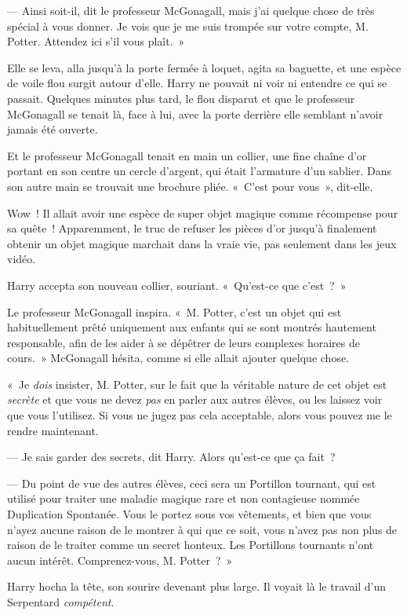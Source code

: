 --- Ainsi soit-il, dit le professeur McGonagall, mais j'ai quelque chose de très spécial à vous donner. Je vois que je me suis trompée sur votre compte, M. Potter. Attendez ici s'il vous plaît.~»

Elle se leva, alla jusqu'à la porte fermée à loquet, agita sa baguette, et une espèce de voile flou surgit autour d'elle. Harry ne pouvait ni voir ni entendre ce qui se passait. Quelques minutes plus tard, le flou disparut et que le professeur McGonagall se tenait là, face à lui, avec la porte derrière elle semblant n'avoir jamais été ouverte.

Et le professeur McGonagall tenait en main un collier, une fine chaîne d'or portant en son centre un cercle d'argent, qui était l'armature d'un sablier. Dans son autre main se trouvait une brochure pliée. «~C'est pour vous~», dit-elle.

Wow~! Il allait avoir une espèce de super objet magique comme récompense pour sa quête~! Apparemment, le truc de refuser les pièces d'or jusqu'à finalement obtenir un objet magique marchait dans la vraie vie, pas seulement dans les jeux vidéo.

Harry accepta son nouveau collier, souriant. «~Qu'est-ce que c'est~?~»

Le professeur McGonagall inspira. «~M. Potter, c'est un objet qui est habituellement prêté uniquement aux enfants qui se sont montrés hautement responsable, afin de les aider à se dépêtrer de leurs complexes horaires de cours.~» McGonagall hésita, comme si elle allait ajouter quelque chose.

«~Je \emph{dois} insister, M. Potter, sur le fait que la véritable nature de cet objet est \emph{secrète} et que vous ne devez \emph{pas} en parler aux autres élèves, ou les laissez voir que vous l'utilisez. Si vous ne jugez pas cela acceptable, alors vous pouvez me le rendre maintenant.

--- Je sais garder des secrets, dit Harry. Alors qu'est-ce que ça fait~?

--- Du point de vue des autres élèves, ceci sera un Portillon tournant, qui est utilisé pour traiter une maladie magique rare et non contagieuse nommée Duplication Spontanée. Vous le portez sous vos vêtements, et bien que vous n'ayez aucune raison de le montrer à qui que ce soit, vous n'avez pas non plus de raison de le traiter comme un secret honteux. Les Portillons tournants n'ont aucun intérêt. Comprenez-vous, M. Potter~?~»

Harry hocha la tête, son sourire devenant plus large. Il voyait là le travail d'un Serpentard \emph{compétent}.

